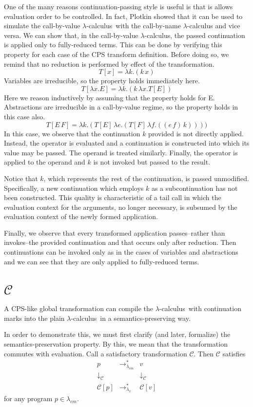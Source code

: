 \documentclass[ms,electronic,twosidetoc,letterpaper,chaptercenter,parttop]{byumsphd}
\newcommand{\lc}{$\lambda$-calculus}
\newcommand{\lvrrs}{\rightarrow_{\lambda_v}^{*}}
\newcommand{\cmrrs}{\rightarrow_{\lambda_{cm}}^{*}}
\newcommand{\C}[1]{\mathcal{C}[#1]}
\begin{document}
One of the many reasons continuation-passing style is useful is that is allows evaluation
order to be controlled. In fact, Plotkin \cite{plotkin1975call} showed that it can be used
to simulate the call-by-value \lc\ with the call-by-name \lc
and vice versa. We can show that, in the call-by-value \lc, the passed
continuation is applied only to fully-reduced terms. This can be done by verifying this
property for each case of the CPS transform definition. Before doing so, we remind that no
reduction is performed by effect of the transformation.
\[
T[x]=\lambda k.(k\,x)
\]
Variables are irreducible, so the property holds immediately here.
\[
T[\lambda x.E]=\lambda k.(k\,\lambda x.T[E])
\]
Here we reason inductively by assuming that the property holds for E. Abstractions are
irreducible in a call-by-value regime, so the property holds in this case also.
\[
T[E\,F]=\lambda k.(T[E]\,\lambda e.(T[F]\,\lambda f.((e\,f)\,k))))
\]
In this case, we observe that the continuation $k$ provided is not directly applied.
Instead, the operator is evaluated and a continuation is constructed into which its value
may be passed. The operand is treated similarly. Finally, the operator is applied to the
operand and $k$ is not invoked but passed to the result.

Notice that $k$, which represents the rest of the continuation, is passed unmodified.
Specifically, a new continuation which employs $k$ as a subcontinuation has not been
constructed. This quality is characteristic of a tail call in which the evaluation context
for the arguments, no longer necessary, is subsumed by the evaluation context of the newly
formed application.

Finally, we observe that every transformed application passes--rather than invokes--the
provided continuation and that occurs only after reduction. Then continuations can be
invoked only as in the cases of variables and abstractions and we can see that they are 
only applied to fully-reduced terms.


\chapter{$\mathcal{C}$}

A CPS-like global transformation can compile the \lc\ with continuation marks into
the plain \lc\ in a semantics-preserving way.

In order to demonstrate this, we must first clarify (and later, formalize) the
semantics-preservation property. By this, we mean that the transformation commutes with
evaluation. Call a satisfactory transformation $\mathcal{C}$. Then $\mathcal{C}$ satisfies 
\[
\begin{array}{ccc}
p & \cmrrs & v\\
\downarrow_\mathcal{C} & & \downarrow_\mathcal{C}\\
\C{p} & \lvrrs & \C{v}
\end{array}
\]
for any program $p\in\lambda_{cm}$.
\end{document}

